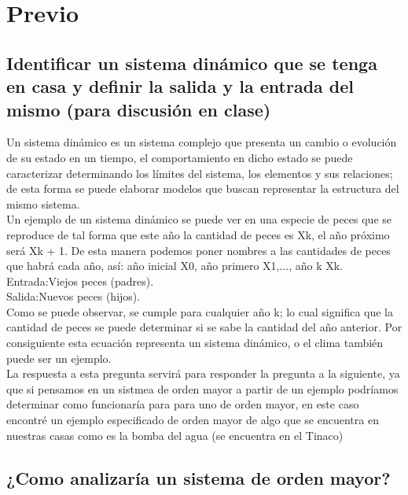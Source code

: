 \noindent \justifying

\section{Previo}

\subsection{Identificar un sistema dinámico que se tenga en casa y definir la salida y la entrada del mismo (para discusión en clase)}

Un sistema dinámico es un sistema complejo que presenta un cambio o evolución de su estado en un tiempo, el comportamiento en dicho estado se puede caracterizar determinando los límites del sistema, los elementos y sus relaciones; de esta forma se puede elaborar modelos que buscan representar la estructura del mismo sistema.\\
Un ejemplo de un sistema dinámico se puede ver en una especie de peces que se reproduce de tal forma que este año la cantidad de peces es Xk, el año próximo será Xk + 1. De esta manera podemos poner nombres a las cantidades de peces que habrá cada año, así: año inicial X0, año primero X1,..., año k Xk.\\
Entrada:Viejos peces (padres).\\
Salida:Nuevos peces (hijos).\\	
Como se puede observar, se cumple para cualquier año k; lo cual significa que la cantidad de peces se puede determinar si se sabe la cantidad del año anterior. Por consiguiente esta ecuación representa un sistema dinámico, o el clima también puede ser un ejemplo.\\


La respuesta a esta pregunta servirá para responder la pregunta a la siguiente, ya que si pensamos en un sistmea de orden mayor a partir de un ejemplo podríamos determinar como funcionaría para para uno de orden mayor, en este caso encontré un ejemplo especificado de orden mayor de algo que se encuentra en nuestras casas como es la bomba del agua (se encuentra en el Tinaco)



\subsection{¿Como analizaría un sistema de orden mayor?}

